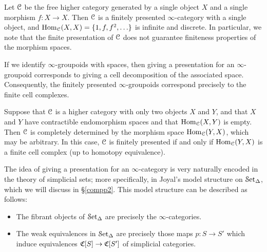 \begin{Didn't Read}
\begin{example}\label{infinitemorphisms}
Let $\operatorname{\mathcal{C}}$ be the free higher category generated by a single
object $X$ and a single morphism $f: X \rightarrow X$. Then
$\operatorname{\mathcal{C}}$ is a finitely presented $\infty$-category with a single
object, and $\operatorname{Hom}_{\operatorname{\mathcal{C}}}(X,X) = \{ 1, f, f^2, \ldots \}$ is
infinite and discrete. In particular, we note that the finite
presentation of $\operatorname{\mathcal{C}}$ does not guarantee finiteness properties
of the morphism spaces.
\end{example}

\begin{example}
If we identify $\infty$-groupoids with spaces, then giving a
presentation for an $\infty$-groupoid corresponds to giving a cell
decomposition of the associated space. Consequently, the finitely
presented $\infty$-groupoids correspond precisely to the finite
cell complexes.
\end{example}

\begin{example}
Suppose that $\operatorname{\mathcal{C}}$ is a higher category with only two objects
$X$ and $Y$, and that $X$ and $Y$ have contractible endomorphism
spaces and that $\operatorname{Hom}_{\operatorname{\mathcal{C}}}(X,Y)$ is empty. Then $\operatorname{\mathcal{C}}$ is
completely determined by the morphism space $\operatorname{Hom}_{\operatorname{\mathcal{C}}}(Y,X)$,
which may be arbitrary. In this case, $\operatorname{\mathcal{C}}$ is finitely
presented if and only if $\operatorname{Hom}_{\operatorname{\mathcal{C}}}(Y,X)$ is a finite cell
complex (up to homotopy equivalence).
\end{example}

The idea of giving a presentation for an $\infty$-category is very
naturally encoded in the theory of simplicial sets; more
specifically, in Joyal's model structure on $\operatorname{\mathcal{S}et_{\Delta}}$, which we will discuss in
\S \ref{compp2}. This model structure can be described as follows:

\begin{itemize}
\item The fibrant objects of $\operatorname{\mathcal{S}et_{\Delta}}$ are precisely the
$\infty$-categories.

\item The weak equivalences in $\operatorname{\mathcal{S}et_{\Delta}}$ are precisely those maps
$p: S \rightarrow S'$ which induce equivalences $\operatorname{\mathfrak{C}}[S] \rightarrow \operatorname{\mathfrak{C}}[S']$
of simplicial categories.
\end{itemize}


\end{Didn't Read}
